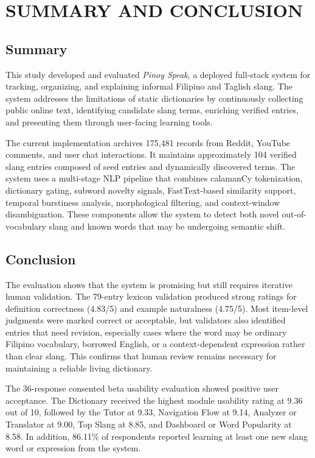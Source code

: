\section{SUMMARY AND CONCLUSION}

\subsection{Summary}

This study developed and evaluated \textit{Pinoy Speak}, a
deployed full-stack system for tracking, organizing, and
explaining informal Filipino and Taglish slang. The system
addresses the limitations of static dictionaries by
continuously collecting public online text, identifying
candidate slang terms, enriching verified entries, and
presenting them through user-facing learning tools.

The current implementation archives 175,481 records from
Reddit, YouTube comments, and user chat interactions. It
maintains approximately 104 verified slang entries composed
of seed entries and dynamically discovered terms. The system
uses a multi-stage NLP pipeline that combines calamanCy
tokenization, dictionary gating, subword novelty signals,
FastText-based similarity support, temporal burstiness
analysis, morphological filtering, and context-window
disambiguation. These components allow the system to detect
both novel out-of-vocabulary slang and known words that may
be undergoing semantic shift.

\subsection{Conclusion}

The evaluation shows that the system is promising but still
requires iterative human validation. The 79-entry lexicon
validation produced strong ratings for definition correctness
(4.83/5) and example naturalness (4.75/5). Most item-level
judgments were marked correct or acceptable, but validators
also identified entries that need revision, especially cases
where the word may be ordinary Filipino vocabulary, borrowed
English, or a context-dependent expression rather than clear
slang. This confirms that human review remains necessary for
maintaining a reliable living dictionary.

The 36-response consented beta usability evaluation showed
positive user acceptance. The Dictionary received the highest
module usability rating at 9.36 out of 10, followed by the
Tutor at 9.33, Navigation Flow at 9.14, Analyzer or Translator
at 9.00, Top Slang at 8.85, and Dashboard or Word Popularity
at 8.58. In addition, 86.11\% of respondents reported
learning at least one new slang word or expression from the
system.

